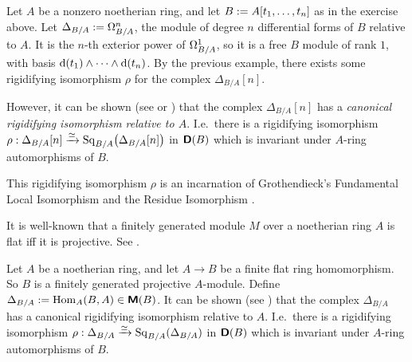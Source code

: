 \begin{exa} \label{exa:2576}
Let $A$ be a nonzero noetherian ring, and let
$B := \lb A[t_1, \ldots, t_n]$ as in the exercise above. 
Let $\Delta_{B / A} := \Omega^n_{B / A}$, the module of degree $n$ 
differential forms of $B$ relative to $A$. 
It is the $n$-th exterior power of $\Omega^1_{B / A}$, so it is a free 
$B$ module of rank $1$, with basis 
$\mathrm{d}(t_1) \wedge \cdots \wedge \mathrm{d}(t_n)$.
By the previous example, there exists some rigidifying isomorphism $\rho$ for 
the complex $\Delta_{B / A}[n]$. 

However, it can be shown (see \cite{YeZh3} or \cite{Ye11}) that the complex
$\Delta_{B / A}[n]$ has a {\em canonical rigidifying isomorphism relative to 
$A$}. I.e.\ there is a rigidifying isomorphism 
$\rho : \Delta_{B / A}[n] \xrightarrow{\simeq} 
\operatorname{Sq}_{B / A} \bigl( \Delta_{B / A}[n] \bigr)$
in $\boldsymbol{\mathsf{D}}(B)$ which is invariant under $A$-ring automorphisms of $B$. 

This rigidifying isomorphism $\rho$ is an incarnation of Grothendieck's 
Fundamental Local Isomorphism \cite[Proposition II.7.2]{RD} and the Residue 
Isomorphism
\cite[Theorem II.8.2]{RD}. 
\end{exa}

It is well-known that a finitely generated module $M$ over a noetherian ring 
$A$ is flat iff it is projective. See \cite[Corollary to Theorem 7.12]{Mats}. 

\begin{exa} \label{exa:2575}
Let $A$ be a noetherian ring, and let $A \to B$ be a finite flat ring 
homomorphism. So $B$ is a finitely generated projective $A$-module. Define 
$\Delta_{B / A} := \operatorname{Hom}_{A}(B, A) \in \boldsymbol{\mathsf{M}}(B)$.
It can be shown (see \cite{Ye11}) that the complex 
$\Delta_{B / A}$ has a canonical rigidifying isomorphism relative to $A$. I.e.\ 
there is a rigidifying isomorphism 
$\rho : \Delta_{B / A} \xrightarrow{\simeq} \operatorname{Sq}_{B / A}(\Delta_{B / A})$
in $\boldsymbol{\mathsf{D}}(B)$ which is invariant under $A$-ring automorphisms of $B$. 
\end{exa}


